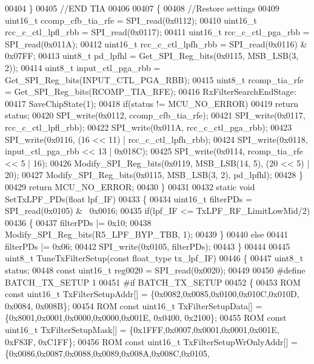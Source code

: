 \begin{DoxyCode}
00404     \}
00405     \textcolor{comment}{//END TIA}
00406 
00407     \{
00408     \textcolor{comment}{//Restore settings}
00409     uint16\_t ccomp\_cfb\_tia\_rfe = SPI_read(0x0112);
00410     uint16\_t rcc\_c\_ctl\_lpfl\_rbb = SPI_read(0x0117);
00411     uint16\_t rcc\_c\_ctl\_pga\_rbb = SPI_read(0x011A);
00412     uint16\_t rcc\_c\_ctl\_lpfh\_rbb = SPI_read(0x0116) & 0x07FF;
00413     uint8\_t pd\_lpfhl = Get_SPI_Reg_bits(0x0115, MSB_LSB(3, 2));
00414     uint8\_t input\_ctl\_pga\_rbb = Get_SPI_Reg_bits(INPUT_CTL_PGA_RBB);
00415     uint8\_t rcomp\_tia\_rfe = Get_SPI_Reg_bits(RCOMP_TIA_RFE);
00416 RxFilterSearchEndStage:
00417     SaveChipState(1);
00418     \textcolor{keywordflow}{if}(status != MCU_NO_ERROR)
00419         \textcolor{keywordflow}{return} status;
00420     SPI_write(0x0112, ccomp\_cfb\_tia\_rfe);
00421     SPI_write(0x0117, rcc\_c\_ctl\_lpfl\_rbb);
00422     SPI_write(0x011A, rcc\_c\_ctl\_pga\_rbb);
00423     SPI_write(0x0116, (16 << 11) | rcc\_c\_ctl\_lpfh\_rbb);
00424     SPI_write(0x0118, input\_ctl\_pga\_rbb << 13 | 0x018C);
00425     SPI_write(0x0114, rcomp\_tia\_rfe << 5 | 16);
00426     Modify_SPI_Reg_bits(0x0119, MSB_LSB(14, 5), (20 << 5) | 20);
00427     Modify_SPI_Reg_bits(0x0115, MSB_LSB(3, 2), pd\_lpfhl);
00428     \}
00429     \textcolor{keywordflow}{return} MCU_NO_ERROR;
00430 \}
00431 
00432 \textcolor{keyword}{static} \textcolor{keywordtype}{void} SetTxLPF_PDs(\textcolor{keywordtype}{float} lpf\_IF)
00433 \{
00434     uint16\_t filterPDs = SPI_read(0x0105) & ~0x0016;
00435     \textcolor{keywordflow}{if}(lpf\_IF <= TxLPF_RF_LimitLowMid/2)
00436     \{
00437         filterPDs |= 0x10;
00438         Modify_SPI_Reg_bits(R5_LPF_BYP_TBB, 1);
00439     \}
00440     \textcolor{keywordflow}{else}
00441         filterPDs |= 0x06;
00442     SPI_write(0x0105, filterPDs);
00443 \}
00444 
00445 uint8\_t TuneTxFilterSetup(\textcolor{keyword}{const} float_type tx\_lpf\_IF)
00446 \{
00447     uint8\_t status;
00448     \textcolor{keyword}{const} uint16\_t reg0020 = SPI_read(0x0020);
00449 
00450 \textcolor{preprocessor}{#define BATCH\_TX\_SETUP 1}
00451 \textcolor{preprocessor}{#if BATCH\_TX\_SETUP}
00452     \{
00453         ROM \textcolor{keyword}{const} uint16\_t TxFilterSetupAddr[] = \{0x0082,0x0085,0x0100,0x010C,0x010D, 0x0084, 0x008B\};
00454         ROM \textcolor{keyword}{const} uint16\_t TxFilterSetupData[] = \{0x8001,0x0001,0x0000,0x0000,0x001E, 0x0400, 0x2100\};
00455         ROM \textcolor{keyword}{const} uint16\_t TxFilterSetupMask[] = \{0x1FFF,0x0007,0x0001,0x0001,0x001E, 0xF83F, 0xC1FF\};
00456         ROM \textcolor{keyword}{const} uint16\_t TxFilterSetupWrOnlyAddr[] = \{0x0086,0x0087,0x0088,0x0089,0x008A,0x008C,0x0105,

\end{DoxyCode}
